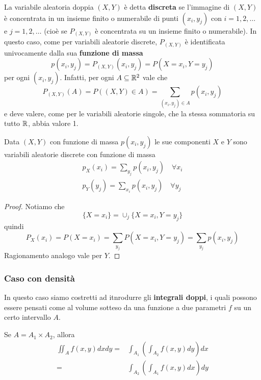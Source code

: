 \begin{definition}
	La variabile aleatoria doppia $(X,Y)$ è detta \textbf{discreta} se l'immagine di $(X,Y)$ è
	concentrata in un insieme finito o numerabile di punti $(x_i, y_j)$ con $i = 1,2,\dots$ e
	$j = 1,2,\dots$ (cioè se $P_{(X,Y)}$ è concentrata su un insieme finito o numerabile). In
	questo caso, come per variabili aleatorie discrete, $P_{(X,Y)}$ è identificata univocamente
	dalla sua \textbf{funzione di massa}
	\[ p(x_i, y_j) = P_{(X,Y)} (x_i, y_j) = P(X = x_i, Y = y_j) \]
	per ogni $(x_i, y_j)$. Infatti, per ogni $A \subseteq \mathbb{R}^2$ vale che
	\[ P_{(X,Y)} (A) = P((X,Y) \in A) = \sum_{(x_i, y_j) \in A} p(x_i, y_j) \]
	e deve valere, come per le variabili aleatorie singole, che la stessa sommatoria su tutto $\mathbb{R}$,
	abbia valore 1.
\end{definition}

\begin{proposition}
	Data $(X, Y)$ con funzione di massa $p(x_i, y_j)$ le sue componenti $X$ e $Y$ sono variabili
	aleatorie discrete con funzione di massa
	\begin{gather*}
		p_X(x_i) = \sum_{y_j} p (x_i, y_j) \quad \forall x_i \\
		p_Y(y_j) = \sum_{x_i} p (x_i, y_j) \quad \forall y_j
	\end{gather*}
	\begin{proof}
		Notiamo che
		\[ \{ X = x_i \} = \cup_{j} \{ X = x_i, Y = y_j \} \]
		quindi
		\[ P_X(x_i) = P(X = x_i) = \sum_{y_j} P(X = x_i, Y = y_j) = \sum_{y_j} p(x_i, y_j) \]
		Ragionamento analogo vale per $Y$.
	\end{proof}
\end{proposition}

\subsubsection{Caso con densità}
In questo caso siamo costretti ad itnrodurre gli \textbf{integrali doppi}, i quali possono essere
pensati come al volume sotteso da una funzione a due parametri $f$ su un certo intervallo $A$.

\begin{theorem}
	Se $A = A_1 \times A_2$, allora
	\begin{align*}
		\iint_A f(x,y) dx dy = & \int_{A_1} \left( \int_{A_2} f(x,y) dy \right) dx \\
		=                      & \int_{A_2} \left( \int_{A_1} f(x,y) dx \right) dy
	\end{align*}
\end{theorem}

